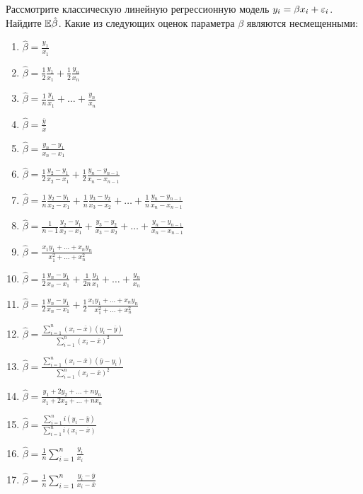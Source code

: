 \documentclass[pdftex,11pt,openany]{book}\usepackage[]{graphicx}\usepackage[]{color}
\begin{document}
\begin{problem}
 Рассмотрите классическую линейную регрессионную модель $y_i = \beta x_i + \varepsilon_i$. Найдите $\mathbb{E} \hat{\beta}$. Какие из следующих оценок параметра $\beta$ являются несмещенными:

\begin{enumerate}
\item $\hat{\beta} = \frac{y_1}{x_1}$
\item $\hat{\beta} = \frac{1}{2} \frac{y_1}{x_1} + \frac{1}{2} \frac{y_n}{x_n}$
\item $\hat{\beta} = \frac{1}{n}  \frac{y_1}{x_1} + \ldots + \frac{y_n}{x_n} $
\item $\hat{\beta} = \frac{\overline{y}}{\overline{x}}$
\item $\hat{\beta} = \frac{y_n - y_1}{x_n - x_1}$
\item $\hat{\beta} = \frac{1}{2} \frac{y_2 - y_1}{x_2 - x_1} + \frac{1}{2} \frac{y_n - y_{n-1}}{x_n - x_{n-1}}$
\item $\hat{\beta} = \frac{1}{n} \frac{y_2 - y_1}{x_2 - x_1} + \frac{1}{n} \frac{y_3 - y_2}{x_3 - x_2} + \ldots + \frac{1}{n} \frac{y_n - y_{n-1}}{x_n - x_{n-1}}$
\item $\hat{\beta} = \frac{1}{n-1}  \frac{y_2 - y_1}{x_2 - x_1} + \frac{y_3 - y_2}{x_3 - x_2} + \ldots + \frac{y_n - y_{n-1}}{x_n - x_{n-1}} $
\item $\hat{\beta} = \frac{x_1 y_1 + \ldots + x_n y_n}{x_1^2 + \ldots + x_n^2}$
\item $\hat{\beta} = \frac{1}{2} \frac{y_n - y_1}{x_n - x_1} + \frac{1}{2n}  \frac{y_1}{x_1} + \ldots + \frac{y_n}{x_n} $
\item $\hat{\beta} =  \frac{1}{2} \frac{y_n - y_1}{x_n - x_1} + \frac{1}{2} \frac{x_1 y_1 + \ldots + x_n y_n}{x_1^2 + \ldots + x_n^2}$
\item $\hat{\beta} = \frac{\sum_{i=1}^n (x_i - \overline{x})(y_i - \overline{y})}{\sum_{i=1}^n (x_i - \overline{x})^2}$
\item $\hat{\beta} = \frac{\sum_{i=1}^n (x_i - \overline{x})(\overline{y} - y_i)}{\sum_{i=1}^n (x_i - \overline{x})^2}$
\item $\hat{\beta} = \frac{y_1 + 2 y_2 + \ldots + n y_n}{x_1 + 2 x_2 + \ldots + n x_n}$
\item $\hat{\beta} = \frac{\sum_{i=1}^n i(y_i - \overline{y})}{\sum_{i=1}^n i(x_i - \overline{x})}$
\item $\hat{\beta} = \frac{1}{n} \sum_{i=1}^n \frac{y_i}{x_i}$
\item $\hat{\beta} = \frac{1}{n} \sum_{i=1}^n \frac{y_i - \overline{y}}{x_i - \overline{x}}$
\end{enumerate}
\end{problem}
\end{document}
